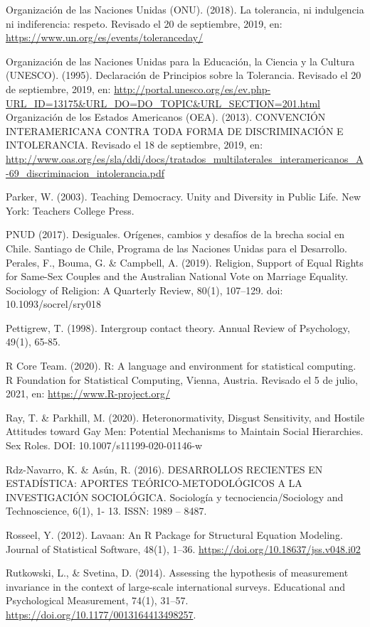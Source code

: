 \documentclass[12pt,twoside]{templates/facsothesis}
\begin{document}
Organización de las Naciones Unidas (ONU). (2018). La tolerancia, ni indulgencia ni indiferencia: respeto. Revisado el 20 de septiembre, 2019, en: \url{https://www.un.org/es/events/toleranceday/}

Organización de las Naciones Unidas para la Educación, la Ciencia y la Cultura (UNESCO). (1995). Declaración de Principios sobre la Tolerancia. Revisado el 20 de septiembre, 2019, en: \url{http://portal.unesco.org/es/ev.php-URL_ID=13175\&URL_DO=DO_TOPIC\&URL_SECTION=201.html}
Organización de los Estados Americanos (OEA). (2013). CONVENCIÓN INTERAMERICANA CONTRA TODA FORMA DE DISCRIMINACIÓN E INTOLERANCIA. Revisado el 18 de septiembre, 2019, en: \url{http://www.oas.org/es/sla/ddi/docs/tratados_multilaterales_interamericanos_A-69_discriminacion_intolerancia.pdf}

Parker, W. (2003). Teaching Democracy. Unity and Diversity in Public Life. New York: Teachers College Press.

PNUD (2017). Desiguales. Orígenes, cambios y desafíos de la brecha social en Chile. Santiago de Chile, Programa de las Naciones Unidas para el Desarrollo.
Perales, F., Bouma, G. \& Campbell, A. (2019). Religion, Support of Equal Rights for Same-Sex Couples and the Australian National Vote on Marriage Equality. Sociology of Religion: A Quarterly Review, 80(1), 107--129. doi: 10.1093/socrel/sry018

Pettigrew, T. (1998). Intergroup contact theory. Annual Review of Psychology, 49(1), 65-85.

R Core Team. (2020). R: A language and environment for statistical computing. R Foundation for Statistical Computing, Vienna, Austria. Revisado el 5 de julio, 2021, en: \url{https://www.R-project.org/}

Ray, T. \& Parkhill, M. (2020). Heteronormativity, Disgust Sensitivity, and Hostile Attitudes toward Gay Men: Potential Mechanisms to Maintain Social Hierarchies. Sex Roles. DOI: 10.1007/s11199-020-01146-w

Rdz-Navarro, K. \& Asún, R. (2016). DESARROLLOS RECIENTES EN ESTADÍSTICA: APORTES TEÓRICO-METODOLÓGICOS A LA INVESTIGACIÓN SOCIOLÓGICA. Sociología y tecnociencia/Sociology and Technoscience, 6(1), 1- 13. ISSN: 1989 -- 8487.

Rosseel, Y. (2012). Lavaan: An R Package for Structural Equation Modeling. Journal of Statistical Software, 48(1), 1--36. \url{https://doi.org/10.18637/jss.v048.i02}

Rutkowski, L., \& Svetina, D. (2014). Assessing the hypothesis of measurement invariance in the context of large-scale international surveys. Educational and Psychological Measurement, 74(1), 31--57. \url{https://doi.org/10.1177/0013164413498257}.
\end{document}
